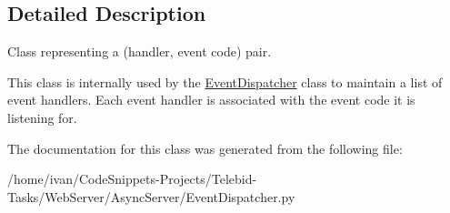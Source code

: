 \subsection{Detailed Description}
Class representing a (handler, event code) pair. 

This class is internally used by the \hyperlink{class_event_dispatcher_1_1_event_dispatcher}{Event\-Dispatcher} class to maintain a list of event handlers. Each event handler is associated with the event code it is listening for. 

The documentation for this class was generated from the following file\-:\begin{DoxyCompactItemize}
\item 
/home/ivan/\-Code\-Snippets-\/\-Projects/\-Telebid-\/\-Tasks/\-Web\-Server/\-Async\-Server/Event\-Dispatcher.\-py\end{DoxyCompactItemize}
